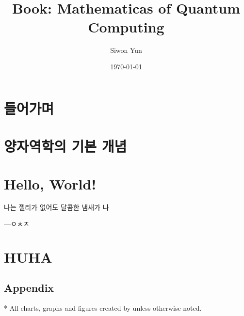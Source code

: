 \documentclass[openany]{book}
\title{Book: Mathematicas of Quantum Computing}
\author{Siwon Yun}
\date{\today}
\begin{document}
\maketitle

\toctrue
\tableofcontents
\tocfalse

\newpage

\chapter{들어가며}


\chapter{양자역학의 기본 개념}


\chapter{Hello, World!}

\epigraph{나는 젤리가 없어도 달콤한 냄새가 나}{---ㅇㅊㅈ}
% 	

\chapter{HUHA}
%   

\begin{appendices}
\chapter{Appendix}
%   
\end{appendices}

\toctrue

* All charts, graphs and figures created by \printauthor{} unless otherwise noted.


\tocfalse
\end{document}
